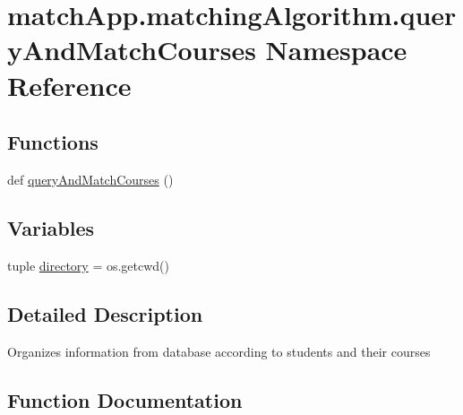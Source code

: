 \hypertarget{namespacematch_app_1_1matching_algorithm_1_1query_and_match_courses}{}\section{match\+App.\+matching\+Algorithm.\+query\+And\+Match\+Courses Namespace Reference}
\label{namespacematch_app_1_1matching_algorithm_1_1query_and_match_courses}
\subsection*{Functions}
\begin{DoxyCompactItemize}
\item 
def \hyperlink{namespacematch_app_1_1matching_algorithm_1_1query_and_match_courses_ad9a21ebabe891164c9f7639c6358ae7c}{query\+And\+Match\+Courses} ()
\end{DoxyCompactItemize}
\subsection*{Variables}
\begin{DoxyCompactItemize}
\item 
tuple \hyperlink{namespacematch_app_1_1matching_algorithm_1_1query_and_match_courses_a0bd38294da3bda8051731c034f1de149}{directory} = os.\+getcwd()
\end{DoxyCompactItemize}


\subsection{Detailed Description}
\begin{DoxyVerb}Organizes information from database according to students and their courses\end{DoxyVerb}
 

\subsection{Function Documentation}
\hypertarget{namespacematch_app_1_1matching_algorithm_1_1query_and_match_courses_ad9a21ebabe891164c9f7639c6358ae7c}{}
